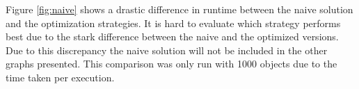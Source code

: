 \documentclass[a4paper, 12pt]{article}
\begin{document}
Figure \ref{fig:naive} shows a drastic difference in runtime between the naive
solution and the optimization strategies. It is hard to evaluate which strategy
performs best due to the stark difference between the naive and the optimized
versions. Due to this discrepancy the naive solution will not be included in the
other graphs presented. This comparison was only run with 1000 objects due to
the time taken per execution.

\end{document}
